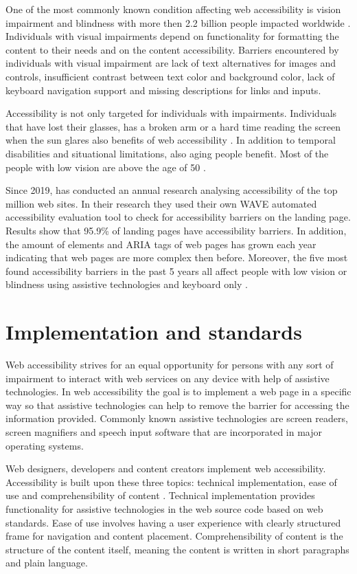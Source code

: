 One of the most commonly known condition affecting web accessibility is vision impairment and blindness with more then 2.2 billion people impacted worldwide \citep[Chapter~1]{webaccessibility, whovision}. Individuals with visual impairments depend on functionality for formatting the content to their needs and on the content accessibility. Barriers encountered by individuals with visual impairment are lack of text alternatives for images and controls, insufficient contrast between text color and background color, lack of keyboard navigation support and missing descriptions for links and inputs. 

Accessibility is not only targeted for individuals with impairments. Individuals that have lost their glasses, has a broken arm or a hard time reading the screen when the sun glares also benefits of web accessibility \citep{w3cbarriers}. In addition to temporal disabilities and situational limitations, also aging people benefit. Most of the people with low vision are above the age of 50 \citep{whovision}.

Since 2019, \textcite{webaimmillions} has conducted an annual research analysing accessibility of the top million web sites. In their research they used their own WAVE automated accessibility evaluation tool to check for accessibility barriers on the landing page. Results show that 95.9\% of landing pages have accessibility barriers. In addition, the amount of elements and ARIA tags of web pages has grown each year indicating that web pages are more complex then before. Moreover, the five most found accessibility barriers in the past 5 years all affect people with low vision or blindness using assistive technologies and keyboard only \citep{webaimmillions}. 

\section{Implementation and standards}

Web accessibility strives for an equal opportunity for persons with any sort of impairment to interact with web services on any device with help of assistive technologies. In web accessibility the goal is to implement a web page in a specific way so that assistive technologies can help to remove the barrier for accessing the information provided. Commonly known assistive technologies are screen readers, screen magnifiers and speech input software that are incorporated in major operating systems.

Web designers, developers and content creators implement web accessibility. Accessibility is built upon these three topics: technical implementation, ease of use and comprehensibility of content \citep{webaccessibilitydefinition}. Technical implementation provides functionality for assistive technologies in the web source code based on web standards. Ease of use involves having a user experience with clearly structured frame for navigation and content placement. Comprehensibility of content is the structure of the content itself, meaning the content is written in short paragraphs and plain language. 

